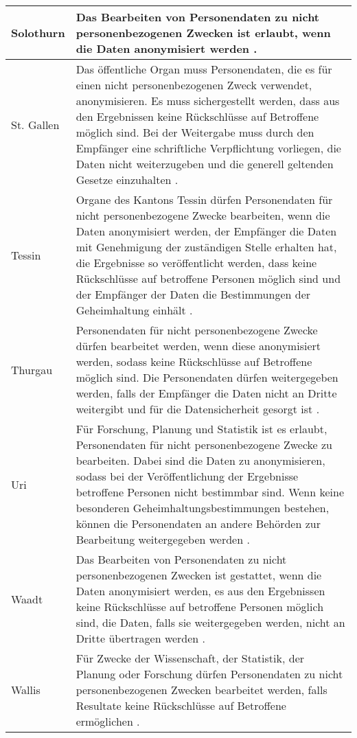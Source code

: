 \begin{longtable}{| p{} | p{}|}
		\hline
		Solothurn & Das Bearbeiten von Personendaten zu nicht personenbezogenen Zwecken ist erlaubt, wenn die Daten anonymisiert werden \parencite[§§ 16 Abs 3]{DSSGSO}. \\
    \hline
		St. Gallen & Das öffentliche Organ muss Personendaten, die es für einen nicht personenbezogenen Zweck verwendet, anonymisieren. Es muss sichergestellt werden, dass aus den Ergebnissen keine Rückschlüsse auf Betroffene möglich sind. Bei der Weitergabe muss durch den Empfänger eine schriftliche Verpflichtung vorliegen, die Daten nicht weiterzugeben und die generell geltenden Gesetze einzuhalten \parencite[§§ 7 Abs 1-3]{DSSGSG}. \\
		\hline
		Tessin & Organe des Kantons Tessin dürfen Personendaten für nicht personenbezogene Zwecke bearbeiten, wenn die Daten anonymisiert werden, der Empfänger die Daten mit Genehmigung der zuständigen Stelle erhalten hat, die Ergebnisse so veröffentlicht werden, dass keine Rückschlüsse auf betroffene Personen möglich sind und der Empfänger der Daten die Bestimmungen der Geheimhaltung einhält \parencite[§§ 15 Abs 1-2]{DSSGTI}. \\
		\hline
		Thurgau & Personendaten für nicht personenbezogene Zwecke dürfen bearbeitet werden, wenn diese anonymisiert werden, sodass keine Rückschlüsse auf Betroffene möglich sind. Die Personendaten dürfen weitergegeben werden, falls der Empfänger die Daten nicht an Dritte weitergibt und für die Datensicherheit gesorgt ist \parencite[§§ 11 Abs 1-3]{DSSGTG}. \\
		\hline
		Uri & Für Forschung, Planung und Statistik ist es erlaubt, Personendaten für nicht personenbezogene Zwecke zu bearbeiten. Dabei sind die Daten zu anonymisieren, sodass bei der Veröffentlichung der Ergebnisse betroffene Personen nicht bestimmbar sind. Wenn keine besonderen Geheimhaltungsbestimmungen bestehen, können die Personendaten an andere Behörden zur Bearbeitung weitergegeben werden \parencite[§§ 10 Abs. 1-2]{DSSGUR}. \\
		\hline
    Waadt & Das Bearbeiten von Personendaten zu nicht personenbezogenen Zwecken ist gestattet, wenn die Daten anonymisiert werden, es aus den Ergebnissen keine Rückschlüsse auf betroffene Personen möglich sind, die Daten, falls sie weitergegeben werden, nicht an Dritte übertragen werden \parencite[§§ 24 Abs 1-3]{DSSGVD}. \\
		\hline
    Wallis & Für Zwecke der Wissenschaft, der Statistik, der Planung oder Forschung dürfen Personendaten zu nicht personenbezogenen Zwecken bearbeitet werden, falls Resultate keine Rückschlüsse auf Betroffene ermöglichen \parencite[§§ 26 Abs. 1]{DSSGVS}.  \\

\end{longtable}
